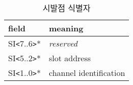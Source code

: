 %
%
\begin{table}[htbp]
\caption{시발점 식별자}
   \begin{center}
   \begin{tabular}{|l|l|} \hline
      field & meaning \\ \hline \hline
      SI{\tt <}7..6{\tt >}* & {\it reserved\/} \\ \hline
      SI{\tt <}5..2{\tt >}* & slot address \\ \hline
      SI{\tt <}1..0{\tt >}* & channel identification \\ \hline
   \end{tabular}
   \end{center}
\end{table}
%
%
